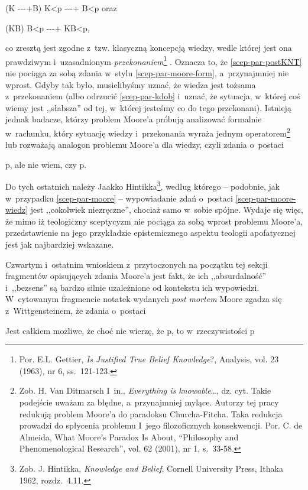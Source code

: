 {(K -{}-{}-+B) K{\textless}p -{}-{}-+ B{\textless}p oraz \label{scep-par-kdob}

(KB) B{\textless}p -{}-{}-+ KB{\textless}p,

co zresztą jest zgodne z~tzw. klasyczną koncepcją wiedzy, wedle której jest ona prawdziwym i~uzasadnionym \textit{przekonaniem}\footnote{Por. E.L. Gettier, \textit{Is Justified True Belief Knowledge}?, Analysis, vol. 23 (1963), nr 6, ss.~121-123.}
. Oznacza to, że \ref{scep-par-postKNT} nie pociąga za sobą zdania w~stylu \ref{scep-par-moore-form}, a~przynajmniej nie wprost. Gdyby tak było, musielibyśmy uznać, że wiedza jest tożsama z~przekonaniem (albo odrzucić \ref{scep-par-kdob} i~uznać, że sytuacja, w~której coś wiemy jest ,,słabsza'' od tej, w~której jesteśmy co do tego przekonani). Istnieją jednak badacze, którzy problem Moore'a próbują analizować formalnie w~rachunku, który sytuację wiedzy i~przekonania wyraża jednym operatorem\footnote{Zob. H. Van Ditmarsch I~in., \textit{Everything is knowable}…, dz. cyt. Takie podejście uważam za błędne, a~przynajmniej mylące. Autorzy tej pracy redukują problem Moore'a do paradoksu Churcha-Fitcha. Taka redukcja prowadzi do spłycenia problemu I~jego filozoficznych konsekwencji. Por. C. de Almeida, What Moore's Paradox Is About, ``Philosophy and Phenomenological Research'', vol. 62 (2001), nr 1, s.~33-58.} lub rozważają analogon problemu Moore'a dla wiedzy, czyli zdania o~postaci

p, ale nie wiem, czy p.\label{scep-par-moore-wiedz}

Do tych ostatnich należy Jaakko Hintikka\footnote{Zob. J. Hintikka, \textit{Knowledge and Belief}, Cornell University Press, Ithaka 1962, rozdz.~4.11.}, według którego -- podobnie, jak w~przypadku \ref{scep-par-moore} -- wypowiadanie zdań o~postaci \ref{scep-par-moore-wiedz} jest ,,cokolwiek niezręczne'', chociaż samo w~sobie spójne. Wydaje się więc, że mimo iż teologiczny sceptycyzm nie pociąga za sobą wprost problemu Moore'a, przedstawienie na jego przykładzie epistemicznego aspektu teologii apofatycznej jest jak najbardziej wskazane.

Czwartym i~ostatnim wnioskiem z~przytoczonych na początku tej sekcji fragmentów opisujących zdania Moore'a jest fakt, że ich ,,absurdalność'' i~,,bezsens'' są bardzo silnie uzależnione od kontekstu ich wypowiedzi. W~cytowanym fragmencie notatek wydanych \textit{post mortem} Moore zgadza się z~Wittgensteinem, że zdania o~postaci

Jest całkiem możliwe, że choć nie wierzę, że p, to w~rzeczywistości p

}

